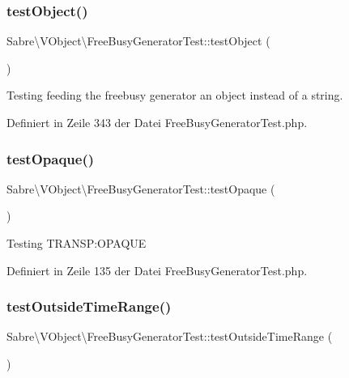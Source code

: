 \subsubsection{\texorpdfstring{test\+Object()}{testObject()}}
{\footnotesize\ttfamily Sabre\textbackslash{}\+V\+Object\textbackslash{}\+Free\+Busy\+Generator\+Test\+::test\+Object (\begin{DoxyParamCaption}{ }\end{DoxyParamCaption})}

Testing feeding the freebusy generator an object instead of a string. 

Definiert in Zeile 343 der Datei Free\+Busy\+Generator\+Test.\+php.

\mbox{\label{class_sabre_1_1_v_object_1_1_free_busy_generator_test_a126c68f611af6c7c60d0395248e36b30}} 
\subsubsection{\texorpdfstring{test\+Opaque()}{testOpaque()}}
{\footnotesize\ttfamily Sabre\textbackslash{}\+V\+Object\textbackslash{}\+Free\+Busy\+Generator\+Test\+::test\+Opaque (\begin{DoxyParamCaption}{ }\end{DoxyParamCaption})}

Testing T\+R\+A\+N\+SP\+:O\+P\+A\+Q\+UE 

Definiert in Zeile 135 der Datei Free\+Busy\+Generator\+Test.\+php.

\mbox{\label{class_sabre_1_1_v_object_1_1_free_busy_generator_test_a66ebab43494d45e79e4636d36057cca2}} 
\subsubsection{\texorpdfstring{test\+Outside\+Time\+Range()}{testOutsideTimeRange()}}
{\footnotesize\ttfamily Sabre\textbackslash{}\+V\+Object\textbackslash{}\+Free\+Busy\+Generator\+Test\+::test\+Outside\+Time\+Range (\begin{DoxyParamCaption}{ }\end{DoxyParamCaption})}

